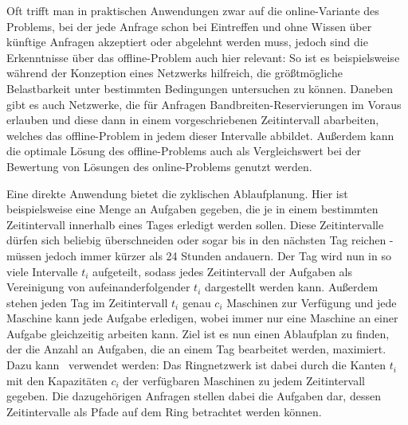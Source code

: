 Oft trifft man in praktischen Anwendungen zwar auf die online-Variante des Problems, bei der jede Anfrage schon bei Eintreffen und
ohne Wissen über künftige Anfragen akzeptiert oder abgelehnt werden muss,
jedoch sind die Erkenntnisse über das offline-Problem auch hier relevant:
So ist es beispielsweise während der Konzeption eines Netzwerks hilfreich, die größtmögliche Belastbarkeit unter bestimmten 
Bedingungen untersuchen zu können.
Daneben gibt es auch Netzwerke, die für Anfragen Bandbreiten-Reservierungen im Voraus erlauben und diese dann in einem 
vorgeschriebenen Zeitintervall abarbeiten, welches das offline-Problem in jedem dieser Intervalle abbildet.
Außerdem kann die optimale Lösung des offline-Problems auch als Vergleichswert bei der Bewertung von Lösungen des
online-Problems genutzt werden.

Eine direkte Anwendung bietet die zyklischen Ablaufplanung.
Hier ist beispielsweise eine Menge an Aufgaben gegeben, die je in einem bestimmten Zeitintervall innerhalb eines Tages erledigt werden sollen.
Diese Zeitintervalle dürfen sich beliebig überschneiden oder sogar bis in den nächsten Tag reichen - müssen jedoch immer kürzer als 24 Stunden andauern.
Der Tag wird nun in so viele Intervalle $t_i$ aufgeteilt, sodass jedes Zeitintervall der Aufgaben als Vereinigung von 
aufeinanderfolgender $t_i$ dargestellt werden kann.
Außerdem stehen jeden Tag im Zeitintervall $t_i$ genau $c_i$ Maschinen zur Verfügung und jede Maschine kann jede Aufgabe erledigen, wobei immer nur 
eine Maschine an einer Aufgabe gleichzeitig arbeiten kann.
Ziel ist es nun einen Ablaufplan zu finden, der die Anzahl an Aufgaben, die an einem Tag bearbeitet werden, maximiert.
Dazu kann \CallControl\ verwendet werden: Das Ringnetzwerk ist dabei durch die Kanten $t_i$ mit den Kapazitäten $c_i$ der verfügbaren Maschinen
zu jedem Zeitintervall gegeben. Die dazugehörigen Anfragen stellen dabei die Aufgaben dar, dessen Zeitintervalle als Pfade auf dem Ring betrachtet
werden können.

